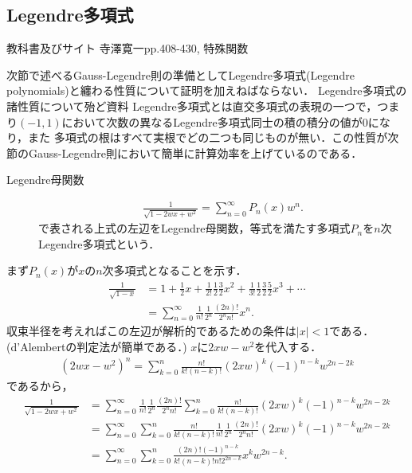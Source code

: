 \documentclass[a4j,papersize,disablejfam,slide,14pt]{jsarticle}
\begin{document}
\subsection{{\rm Legendre}多項式}
	\begin{itembox}[l]{教科書及びサイト}
    	{\rm 寺澤寛一\cite{terakan}pp.408-430, 特殊関数\cite{legendre_polynomials}}
    \end{itembox}
	次節で述べる{\rm Gauss-Legendre}則の準備として{\rm Legendre}多項式({\rm Legendre polynomials})と纏わる性質について証明を加えねばならない．
    {\rm Legendre}多項式の諸性質について殆ど資料%
    {\rm Legendre}多項式とは直交多項式の表現の一つで，つまり$(-1, 1)$において次数の異なる{\rm Legendre}多項式同士の積の積分の値が$0$になり，また
    多項式の根はすべて実根でどの二つも同じものが無い．この性質が次節の{\rm Gauss-Legendre}則において簡単に計算効率を上げているのである．
    \begin{screen}
    	\begin{description}
        \item[{\rm Legendre}母関数]
        	\begin{align}
            	\frac{1}{\sqrt{1 - 2wx + w^2}} = \sum_{n=0}^{\infty} P_n(x) w^n. \label{eq:legendre_generating}
            \end{align}
            で表される上式の左辺を{\rm Legendre}母関数，等式を満たす多項式$P_n$を$n$次{\rm Legendre}多項式という．
    	\end{description}
    \end{screen}
    まず$P_n(x)$が$x$の$n$次多項式となることを示す．
    \begin{align}
    	\frac{1}{\sqrt{1-x}} &= 1 + \frac{1}{2}x + \frac{1}{2!}\frac{1}{2}\frac{3}{2}x^2 + \frac{1}{3!}\frac{1}{2}\frac{3}{2}\frac{5}{2}x^3 + \cdots \\
        &= \sum_{n=0}^{\infty} \frac{1}{n!}\frac{1}{2^n}\frac{(2n)!}{2^n n!} x^n.
    \end{align}
    収束半径を考えればこの左辺が解析的であるための条件は$|x|<1$である．({\rm d'Alembert}の判定法が簡単である．)
    $x$に$2xw - w^2$を代入する．
    \begin{align}
    	(2wx - w^2)^n = \sum_{k=0}^{n} \frac{n!}{k!(n-k)!} (2xw)^k (-1)^{n-k} w^{2n-2k}
    \end{align}
    であるから，
    \begin{align}
    	\frac{1}{\sqrt{1 - 2wx + w^2}} &= \sum_{n=0}^{\infty} \frac{1}{n!}\frac{1}{2^n}\frac{(2n)!}{2^n n!} \sum_{k=0}^{n} \frac{n!}{k!(n-k)!} (2xw)^k (-1)^{n-k} w^{2n-2k} \\
        &= \sum_{n=0}^{\infty} \sum_{k=0}^{n} \frac{n!}{k!(n-k)!} \frac{1}{n!}\frac{1}{2^n}\frac{(2n)!}{2^n n!} (2xw)^k (-1)^{n-k} w^{2n-2k} \\
        &= \sum_{n=0}^{\infty} \sum_{k=0}^{n} \frac{(2n)! (-1)^{n-k}}{k!(n-k)!n!2^{2n-k}} x^k w^{2n-k}.
    \end{align}
\end{document}
